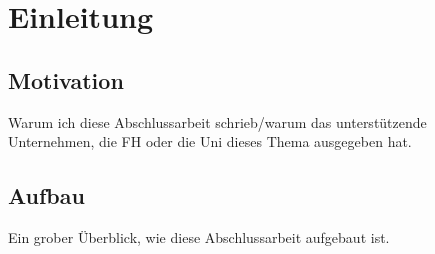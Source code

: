 \chapter*{Einleitung} 


\section*{Motivation}

Warum ich diese Abschlussarbeit schrieb/warum das unterstützende Unternehmen, die FH oder die Uni dieses Thema ausgegeben hat.

\section*{Aufbau}
Ein grober Überblick, wie diese Abschlussarbeit aufgebaut ist.
